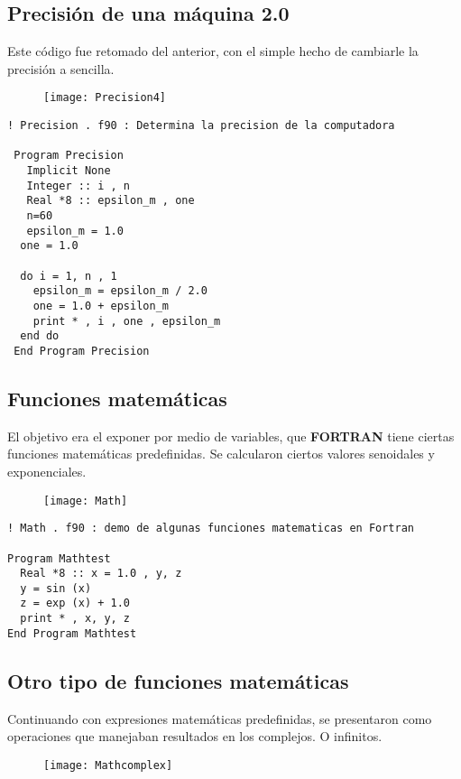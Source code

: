 \documentclass[12pt]{article}
\begin{document}
\subsection{Precisión de una máquina 2.0}
Este código fue retomado del anterior, con el simple hecho de cambiarle la precisión a sencilla.

\begin{figure}[H]
	\centering
    \texttt{[image: Precision4]}
\end{figure}

\begin{verbatim}! Precision . f90 : Determina la precision de la computadora

 Program Precision
   Implicit None
   Integer :: i , n
   Real *8 :: epsilon_m , one
   n=60 
   epsilon_m = 1.0
  one = 1.0
  
  do i = 1, n , 1 
    epsilon_m = epsilon_m / 2.0 
    one = 1.0 + epsilon_m 
    print * , i , one , epsilon_m 
  end do 
 End Program Precision\end{verbatim}

\subsection{Funciones matemáticas}
El objetivo era el exponer por medio de variables, que \textbf{FORTRAN} tiene ciertas funciones matemáticas predefinidas. Se calcularon ciertos valores senoidales y exponenciales.

\begin{figure}[H]
	\centering
    \texttt{[image: Math]}
\end{figure}

\begin{verbatim}! Math . f90 : demo de algunas funciones matematicas en Fortran

Program Mathtest 
  Real *8 :: x = 1.0 , y, z 
  y = sin (x) 
  z = exp (x) + 1.0 
  print * , x, y, z 
End Program Mathtest 
\end{verbatim}

\subsection{Otro tipo de funciones matemáticas}
Continuando con expresiones matemáticas predefinidas, se presentaron como operaciones que manejaban resultados en los complejos. O infinitos.

\begin{figure}[H]
	\centering
    \texttt{[image: Mathcomplex]}
\end{figure}
\end{document}
